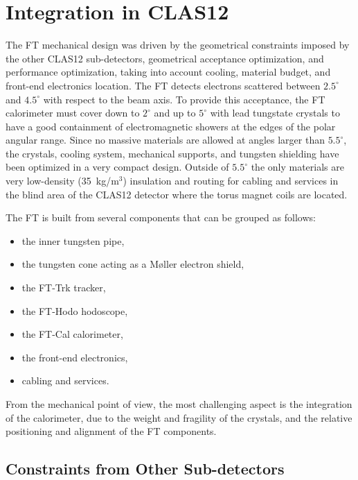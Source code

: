 \section{Integration in CLAS12}
\label{sec:integration}

The FT mechanical design was driven by the geometrical constraints imposed by the other CLAS12 sub-detectors,
geometrical acceptance optimization, and performance optimization, taking into account cooling, material budget, and
front-end electronics location. The FT detects electrons scattered between $2.5^\circ$ and $4.5^\circ$ with respect
to the beam axis. To provide this acceptance, the FT calorimeter must cover down to $2^\circ$ and up to $5^\circ$ with
lead tungstate crystals to have a good containment of electromagnetic showers at the edges of the polar angular range.
Since no massive materials are allowed at angles larger than $5.5^\circ$, the crystals, cooling system, mechanical
supports, and tungsten shielding have been optimized in a very compact design. Outside of $5.5^\circ$ the only
materials are very low-density (35~kg/m$^3$) insulation and routing for cabling and services in the blind area of the
CLAS12 detector where the torus magnet coils are located.

The FT is built from several components that can be grouped as follows:

\begin{itemize}
\item{the inner tungsten pipe,}
\item{the tungsten cone acting as a M{\o}ller electron shield,}
\item{the FT-Trk tracker,}
\item{the FT-Hodo hodoscope,}
\item{the FT-Cal calorimeter,}
\item{the front-end electronics,}
\item{cabling and services.}
\end{itemize}

From the mechanical point of view, the most challenging aspect is the integration of the calorimeter, due to the
weight and fragility of the crystals, and the relative positioning and alignment of the FT components.

\subsection{Constraints from Other Sub-detectors}

